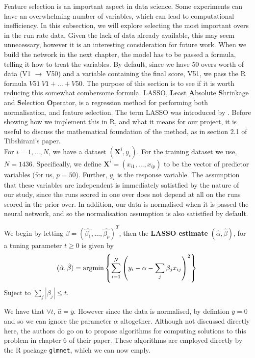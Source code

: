 Feature selection is an important aspect in data science. Some experiments can have an overwhelming number of variables, which can lead to computational inefficiency. In this subsection, we will explore selecting the most important overs in the run rate data.
Given the lack of data already available, this may seem unnecessary, however it is an interesting consideration for future work. When we build the network in the next chapter, the model has to be passed a formula, telling it how to treat the variables. By default, since we have 50 overs worth of data (V1 $\rightarrow$ V50) and a variable containing the final score, V51, we pass the R formula $V51 ~ V1 + \ldots + V50$. The purpose of this section is to see if it is worth reducing this somewhat combersome formula. 
LASSO, \textbf{L}east \textbf{A}bsolute \textbf{S}hrinkage and \textbf{S}election \textbf{O}perator, is a regression method for performing both normalisation, and feature selection. The term LASSO was introduced by \cite{tib}. Before showing how we implement this in R, and what it means for our project, it is useful to discuss the mathematical foundation of the method, as in section 2.1 of Tibshirani's paper. \\

For $i=1,\ldots,N$, we have a dataset $(\textbf{X}^i,y_i)$. For the training dataset we use, $N=1436$. Specifically, we define $\textbf{X}^i = (x_{i1},\ldots,x_{ip})$ to be the vector of predictor variables (for us, $p=50$). Further, $y_i$ is the response variable. The assumption that these variables are independent is immediately satistfied by the nature of our study, since the runs scored in one over does not depend at all on the runs scored in the prior over. In addition, our data is normalised when it is passed the neural network, and so the normalisation assumption is also satistfied by default. 

\begin{definition}
    We begin by letting $\beta = (\hat{\beta_1},\ldots,\hat{\beta_p})^T$, then the \textbf{LASSO estimate} $(\hat{\alpha}, \hat{\beta})$, for a tuning parameter $t \geq 0$ is given by
    \[
        (\hat{\alpha},\hat{\beta}) = \text{argmin} \left\{ \sum_{i=1}^N \left(y_i - \alpha - \sum_j \beta_j x_{ij} \right)^2 \right\} \\
    \]
    Suject to $\sum_j |\beta_j| \leq t$. 
\end{definition}

We have that $\forall t$, $\hat{a} = \bar{y}$. However since the data is normalised, by defintion $\bar{y}=0$ and so we can ignore the parameter $\alpha$ altogether. Although not discussed directly here, the authors do go on to propose algorithms for computing solutions to this problem in chapter 6 of their paper. These algorithms are employed directly by the R package \verb|glmnet|, which we can now emply. \\

